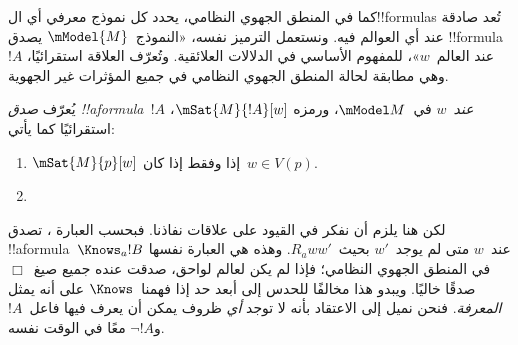 \documentclass[../../../include/open-logic-section]{subfiles}
\begin{document}


كما في المنطق الجهوي النظامي، يحدد كل نموذج معرفي أي ال!!{formula}s تُعد
صادقة عند أي العوالم فيه. ونستعمل الترميز نفسه، «النموذج~$\mModel{M}$
يصدق !!{formula}~$!A$ عند العالم~$w$»، للمفهوم الأساسي في الدلالات
العلائقية. وتُعرّف العلاقة استقرائيًا، وهي مطابقة لحالة المنطق الجهوي
النظامي في جميع المؤثرات غير الجهوية.

\begin{defn}
  يُعرّف \emph{صدق !!a{formula}~$!A$ عند~$w$} في~$\mModel M$، ورمزه
  $\mSat{M}{!A}[w]$، استقرائيًا كما يأتي:
  \begin{enumerate}
  \item $\mSat{M}{p}[w]$ إذا وفقط إذا كان~$w \in V(p)$.
  \item{}
  \end{enumerate}
\end{defn}

لكن هنا يلزم أن نفكر في القيود على علاقات نفاذنا. فبحسب العبارة
، تصدق !!a{formula}~$\Knows_a !B$ عند~$w$
متى لم يوجد~$w'$ بحيث~$R_a ww'$. وهذه هي العبارة نفسها في المنطق الجهوي
النظامي؛ فإذا لم يكن لعالم لواحق، صدقت عنده جميع صيغ~$\Box$ صدقًا خاليًا.
ويبدو هذا مخالفًا للحدس إلى أبعد حد إذا فهمنا~$\Knows$ على أنه يمثل
\emph{المعرفة}. فنحن نميل إلى الاعتقاد بأنه لا توجد \emph{أي} ظروف يمكن
أن يعرف فيها فاعل~$!A$ و$\lnot !A$ معًا في الوقت نفسه.
\end{document}
